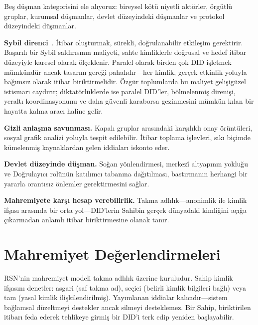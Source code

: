 \documentclass[11pt,a4paper,twocolumn]{article}
\begin{document}
Beş düşman kategorisini ele alıyoruz: bireysel kötü niyetli aktörler, örgütlü gruplar, kurumsal düşmanlar, devlet düzeyindeki düşmanlar ve protokol düzeyindeki düşmanlar.

\textbf{Sybil direnci}~\cite{douceur2002}. İtibar oluşturmak, sürekli, doğrulanabilir etkileşim gerektirir. Başarılı bir Sybil saldırısının maliyeti, sahte kimliklerle doğrusal ve hedef itibar düzeyiyle karesel olarak ölçeklenir. Paralel olarak birden çok DID işletmek mümkündür ancak tasarım gereği pahalıdır---her kimlik, gerçek etkinlik yoluyla bağımsız olarak itibar biriktirmelidir. Özgür toplumlarda bu maliyet gelişigüzel istismarı caydırır; diktatörlüklerde ise paralel DID'ler, bölmelenmiş direnişi, yeraltı koordinasyonunu ve daha güvenli karaborsa gezinmesini mümkün kılan bir hayatta kalma aracı haline gelir.

\textbf{Gizli anlaşma savunması.} Kapalı gruplar arasındaki karşılıklı onay örüntüleri, sosyal grafik analizi yoluyla tespit edilebilir. İtibar toplama işlevleri, sıkı biçimde kümelenmiş kaynaklardan gelen iddiaları iskonto eder.

\textbf{Devlet düzeyinde düşman.} Soğan yönlendirmesi, merkezî altyapının yokluğu ve Doğrulayıcı rolünün katılımcı tabanına dağıtılması, bastırmanın herhangi bir yararla orantısız önlemler gerektirmesini sağlar.

\textbf{Mahremiyete karşı hesap verebilirlik.} Takma adlılık---anonimlik ile kimlik ifşası arasında bir orta yol---DID'lerin Sahibin gerçek dünyadaki kimliğini açığa çıkarmadan anlamlı itibar biriktirmesine olanak tanır.

\section{Mahremiyet Değerlendirmeleri}

RSN'nin mahremiyet modeli takma adlılık üzerine kuruludur. Sahip kimlik ifşasını denetler: asgari (saf takma ad), seçici (belirli kimlik bilgileri bağlı) veya tam (yasal kimlik ilişkilendirilmiş). Yayımlanan iddialar kalıcıdır---sistem bağlamsal düzeltmeyi destekler ancak silmeyi desteklemez. Bir Sahip, biriktirilen itibarı feda ederek tehlikeye girmiş bir DID'i terk edip yeniden başlayabilir.

\end{document}
